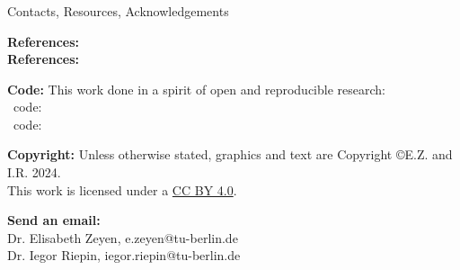 
\begin{frame}\frametitle{\quad}

  {\Large
  \alert{Contacts, Resources, Acknowledgements}
  }

  \vspace{0.1cm}
    
  {\bf References:}
  \\
  {\bf References:} 

  {\bf Code:} This work done in a spirit of open and reproducible research: \\
  \faUnlock~code:
   \\
  \faUnlock~code: 
  
  \vspace{.1cm}
  {\bf Copyright:} Unless otherwise stated, graphics and text are Copyright \copyright E.Z. and I.R. 2024. \\
  This work is licensed under a \href{https://creativecommons.org/licenses/by/4.0/}{CC BY 4.0}.  {\footnotesize \ccby} 

  \vspace{.1cm}
  {\bf Send an email:} \\
  Dr. Elisabeth Zeyen, e.zeyen@tu-berlin.de\\
  Dr. Iegor Riepin, iegor.riepin@tu-berlin.de \\
  
\end{frame}



